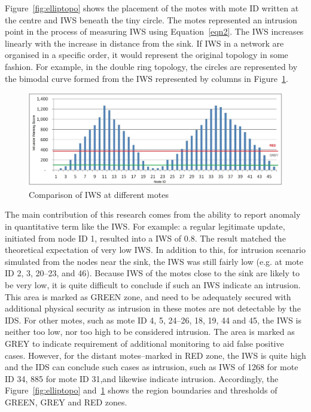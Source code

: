 \documentclass{CRPITStyle}
\begin{document}
Figure~\ref{fig:elliptopo} shows the placement of the motes with mote ID written at the centre and IWS beneath the tiny circle.
The motes represented an intrusion point in the process of measuring IWS using Equation~\ref{eqn2}.
The IWS increases linearly with the increase in distance from the sink.
If IWS in a network are organised in a specific order, it would represent the original topology in some fashion.
For example, in the double ring topology, the circles are represented by the bimodal curve formed from the IWS represented by columns in Figure~\ref{fig:ellipgraph}.
\begin{figure}[tbph!]
	\centering
        \includegraphics[width=\linewidth]{DR_Column}
        \caption{Comparison of IWS at different motes}
        \label{fig:ellipgraph}
\end{figure}

The main contribution of this research comes from the ability to report anomaly in quantitative term like the IWS.
For example:  a regular legitimate update, initiated from node ID 1, resulted into a IWS of 0.8.
The result matched the theoretical expectation of very low IWS.
In addition to this, for intrusion scenario simulated from the nodes near the sink, the IWS was still fairly low (e.g. at mote ID 2, 3, 20--23, and 46). 
Because IWS of the motes close to the sink are likely to be very low, it is quite difficult to conclude if such an IWS indicate an intrusion.
This area is marked as GREEN zone, and need to be adequately secured with additional physical security as intrusion in these motes are not detectable by the IDS.
For other motes, such as mote ID 4, 5, 24--26, 18, 19, 44 and 45, the IWS is neither too low, nor too high to be considered intrusion. The area is marked as GREY to indicate requirement of additional monitoring to aid false positive cases.
However, for the distant motes--marked in RED zone, the IWS is quite high and the IDS can conclude such cases as intrusion, such as IWS of 1268 for mote ID 34, 885 for mote ID 31,and likewise indicate intrusion.
Accordingly, the Figure~\ref{fig:elliptopo} and~\ref{fig:ellipgraph} shows the region boundaries and thresholds of GREEN, GREY and RED zones.%
\end{document}
